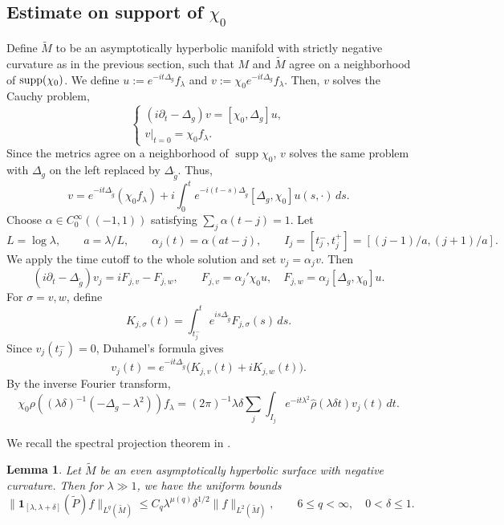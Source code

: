 \documentclass[11pt]{amsart}
\newcommand{\la}{\lambda}
\newtheorem{lemma}{Lemma}[section]
\begin{document}
 \subsection{Estimate on support of $\chi_0$}
Define $\tilde M$ to be an asymptotically hyperbolic manifold with strictly negative curvature as in the previous section, such that $M$ and $\tilde M$ agree on a neighborhood of $\textnormal{supp}(\chi_0)$. We define $u:=e^{-it\Delta_g}f_\la$ and $v:=\chi_0e^{-it\Delta_g}f_\la.$ Then, $v$ solves the Cauchy problem,
\begin{equation}\label{6}
\begin{cases}
(i\partial_t-\Delta_g)v=[\chi_0,\Delta_g]u,\\
v|_{t=0}=\chi_0f_\la.
\end{cases}
\end{equation}
Since the metrics agree on a neighborhood of $\operatorname{supp}\chi_0$, $v$ solves the same problem with $\Delta_g$ on the left replaced by $\Delta_{\tilde g}$. Thus,
\begin{equation}\label{71}
v=e^{-it\Delta_{\tilde g}}(\chi_0f_\la)
+i\int_0^t e^{-i(t-s)\Delta_{\tilde g}}[\Delta_g,\chi_0]u(s,\cdot)\,ds.
\end{equation}
Choose $\alpha\in C_0^\infty((-1,1))$ satisfying $\sum_j\alpha(t-j)=1$. Let
\[
L=\log\la,\qquad a=\la/L,\qquad \alpha_j(t)=\alpha(at-j),
\qquad I_j=[t_j^-,t_j^+]=[(j-1)/a,(j+1)/a].
\]
We apply the time cutoff to the whole solution and set $v_j=\alpha_jv$. Then
\[
(i\partial_t-\Delta_{\tilde g})v_j=iF_{j,v}-F_{j,w},
\qquad F_{j,v}=\alpha_j'\chi_0u,\quad
F_{j,w}=\alpha_j[\Delta_g,\chi_0]u.
\]
For $\sigma=v,w$, define
\[
K_{j,\sigma}(t)=\int_{t_j^-}^t e^{is\Delta_{\tilde g}}F_{j,\sigma}(s)\,ds.
\]
Since $v_j(t_j^-)=0$, Duhamel's formula gives
\begin{equation}\label{7}
v_j(t)=e^{-it\Delta_{\tilde g}}\bigl(K_{j,v}(t)+iK_{j,w}(t)\bigr).
\end{equation}
By the inverse Fourier transform,
\begin{equation}\label{2.3chi0}
\chi_0\rho((\la\delta)^{-1}(-\Delta_g-\la^2))f_\la
=(2\pi)^{-1}\la\delta\sum_j\int_{I_j}
e^{-it\la^2}\widehat\rho(\la\delta t)v_j(t)\,dt.
\end{equation}

We recall the spectral projection theorem in \cite[Theorem 1.2]{HSTZ}.
\begin{lemma}\label{hyperbolicspec}
Let $\tilde M$ be an even asymptotically hyperbolic surface with negative curvature. Then for $\la\gg1$, we have the uniform bounds
\begin{equation}\label{ii.5}
\|\mathbf{1}_{[\la,\la+\delta]}(\tilde P)f\|_{L^q(\tilde M)}
\leq C_q\la^{\mu(q)}\delta^{1/2}\|f\|_{L^2(\tilde M)},
\qquad 6\leq q<\infty,\quad 0<\delta\leq1.
\end{equation}
\end{lemma}
\end{document}
